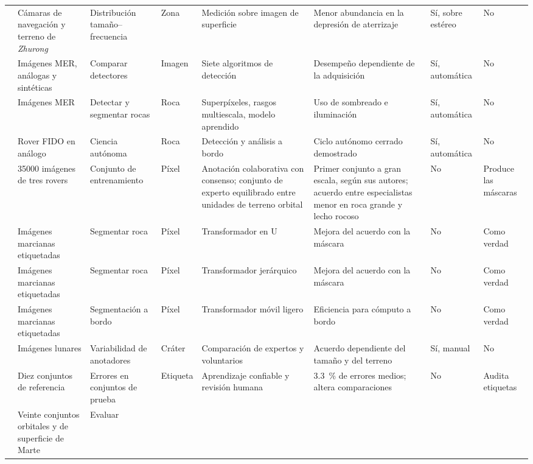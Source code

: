 \begin{landscape}
\begin{spacing}{1}
\begin{longtable}{@{}L{2.6cm}L{2.9cm}L{3.0cm}L{1.4cm}L{3.1cm}L{3.8cm}L{1.6cm}L{1.6cm}@{}}
  \citet{sun2024zhurong} & Cámaras de navegación y terreno de \textit{Zhurong} &
    Distribución tamaño--frecuencia & Zona & Medición sobre imagen de superficie &
    Menor abundancia en la depresión de aterrizaje & Sí, sobre estéreo & No \\
  \citet{thompson2007rockdet} & Imágenes MER, análogas y sintéticas & Comparar detectores &
    Imagen & Siete algoritmos de detección & Desempeño dependiente de la adquisición &
    Sí, automática & No \\
  \citet{dunlop2007multiscale} & Imágenes MER & Detectar y segmentar rocas & Roca &
    Superpíxeles, rasgos multiescala, modelo aprendido & Uso de sombreado e iluminación &
    Sí, automática & No \\
  \citet{castano2007oasis} & Rover FIDO en análogo & Ciencia autónoma & Roca &
    Detección y análisis a bordo & Ciclo autónomo cerrado demostrado & Sí, automática & No \\
  \citet{swan2021ai4mars} & \num{35000} imágenes de tres rovers & Conjunto de entrenamiento &
    Píxel & Anotación colaborativa con consenso; conjunto de experto equilibrado entre unidades
    de terreno orbital & Primer conjunto a gran escala, según sus autores; acuerdo entre
    especialistas menor en roca grande y lecho rocoso & No & Produce las máscaras \\
  \citet{liu2023rockformer} & Imágenes marcianas etiquetadas & Segmentar roca & Píxel &
    Transformador en U & Mejora del acuerdo con la máscara & No & Como verdad \\
  \citet{xiong2023marsformer} & Imágenes marcianas etiquetadas & Segmentar roca & Píxel &
    Transformador jerárquico & Mejora del acuerdo con la máscara & No & Como verdad \\
  \citet{dai2022segmarsvit} & Imágenes marcianas etiquetadas & Segmentación a bordo & Píxel &
    Transformador móvil ligero & Eficiencia para cómputo a bordo & No & Como verdad \\
  \citet{robbins2014craters} & Imágenes lunares & Variabilidad de anotadores & Cráter &
    Comparación de expertos y voluntarios & Acuerdo dependiente del tamaño y del terreno &
    Sí, manual & No \\
  \citet{northcutt2021labelerrors} & Diez conjuntos de referencia & Errores en conjuntos de
    prueba & Etiqueta & Aprendizaje confiable y revisión humana &
    \SI{3.3}{\percent} de errores medios; altera comparaciones & No & Audita etiquetas \\
  \citet{purohit2025marsbench} & Veinte conjuntos orbitales y de superficie de Marte & Evaluar

\end{longtable}
\end{spacing}
\end{landscape}

